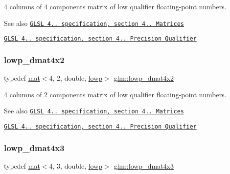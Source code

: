 4 columns of 4 components matrix of low qualifier floating-\/point numbers.

\begin{DoxySeeAlso}{See also}
\href{http://www.opengl.org/registry/doc/GLSLangSpec.4.20.8.pdf}{\tt G\+L\+SL 4.. specification, section 4.. Matrices} 

\href{http://www.opengl.org/registry/doc/GLSLangSpec.4.20.8.pdf}{\tt G\+L\+SL 4.. specification, section 4.. Precision Qualifier} 
\end{DoxySeeAlso}
\mbox{\label{group__core__precision_gaa61cd1362e63979d3e17d53957d2e17f}} 
\subsubsection{\texorpdfstring{lowp\+\_\+dmat4x2}{lowp\_dmat4x2}}
{\footnotesize\ttfamily typedef \mbox{\hyperlink{structglm_1_1mat}{mat}}$<$4, 2, double, \mbox{\hyperlink{namespaceglm_a36ed105b07c7746804d7fdc7cc90ff25ae161af3fc695e696ce3bf69f7332bc2d}{lowp}}$>$ \mbox{\hyperlink{group__core__precision_gaa61cd1362e63979d3e17d53957d2e17f}{glm\+::lowp\+\_\+dmat4x2}}}

4 columns of 2 components matrix of low qualifier floating-\/point numbers.

\begin{DoxySeeAlso}{See also}
\href{http://www.opengl.org/registry/doc/GLSLangSpec.4.20.8.pdf}{\tt G\+L\+SL 4.. specification, section 4.. Matrices} 

\href{http://www.opengl.org/registry/doc/GLSLangSpec.4.20.8.pdf}{\tt G\+L\+SL 4.. specification, section 4.. Precision Qualifier} 
\end{DoxySeeAlso}
\mbox{\label{group__core__precision_gaf829f4341a7592475df926eb9b416dd4}} 
\subsubsection{\texorpdfstring{lowp\+\_\+dmat4x3}{lowp\_dmat4x3}}
{\footnotesize\ttfamily typedef \mbox{\hyperlink{structglm_1_1mat}{mat}}$<$4, 3, double, \mbox{\hyperlink{namespaceglm_a36ed105b07c7746804d7fdc7cc90ff25ae161af3fc695e696ce3bf69f7332bc2d}{lowp}}$>$ \mbox{\hyperlink{group__core__precision_gaf829f4341a7592475df926eb9b416dd4}{glm\+::lowp\+\_\+dmat4x3}}}

